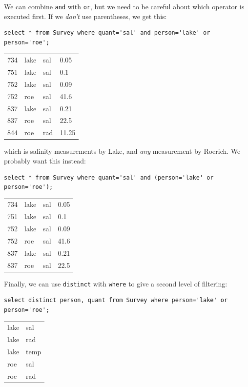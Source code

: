 \documentclass{book}
\begin{document}
We can combine \texttt{and} with \texttt{or}, but we need to be careful
about which operator is executed first. If we \emph{don't} use
parentheses, we get this:

\begin{verbatim}
select * from Survey where quant='sal' and person='lake' or person='roe';
\end{verbatim}

\begin{tabular}{llll}
734 & lake & sal & 0.05 \\
751 & lake & sal & 0.1 \\
752 & lake & sal & 0.09 \\
752 & roe & sal & 41.6 \\
837 & lake & sal & 0.21 \\
837 & roe & sal & 22.5 \\
844 & roe & rad & 11.25 \\
\end{tabular}

which is salinity measurements by Lake, and \emph{any} measurement by
Roerich. We probably want this instead:

\begin{verbatim}
select * from Survey where quant='sal' and (person='lake' or person='roe');
\end{verbatim}

\begin{tabular}{llll}
734 & lake & sal & 0.05 \\
751 & lake & sal & 0.1 \\
752 & lake & sal & 0.09 \\
752 & roe & sal & 41.6 \\
837 & lake & sal & 0.21 \\
837 & roe & sal & 22.5 \\
\end{tabular}

Finally, we can use \texttt{distinct} with \texttt{where} to give a
second level of filtering:

\begin{verbatim}
select distinct person, quant from Survey where person='lake' or person='roe';
\end{verbatim}

\begin{tabular}{ll}
lake & sal \\
lake & rad \\
lake & temp \\
roe & sal \\
roe & rad \\
\end{tabular}
\end{document}

